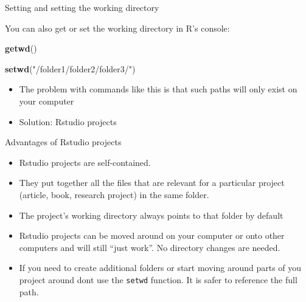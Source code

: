 \documentclass[ignorenonframetext,]{beamer}
\newenvironment{Shaded}{\begin{snugshade}}{\end{snugshade}}
\newcommand{\KeywordTok}[1]{\textcolor[rgb]{0.13,0.29,0.53}{\textbf{#1}}}
\newcommand{\NormalTok}[1]{#1}
\newcommand{\StringTok}[1]{\textcolor[rgb]{0.31,0.60,0.02}{#1}}
\providecommand{\tightlist}{%
  \setlength{\itemsep}{0pt}\setlength{\parskip}{0pt}}
\begin{document}
\begin{frame}[fragile]{Setting and setting the working directory}
\protect\hypertarget{setting-and-setting-the-working-directory}{}

You can also get or set the working directory in R's console:

\begin{Shaded}
\begin{Highlighting}[]
\KeywordTok{getwd}\NormalTok{()}
\end{Highlighting}
\end{Shaded}

\begin{Shaded}
\begin{Highlighting}[]
\KeywordTok{setwd}\NormalTok{(}\StringTok{"/folder1/folder2/folder3/"}\NormalTok{)}
\end{Highlighting}
\end{Shaded}

\begin{itemize}
\tightlist
\item
  The problem with commands like this is that such paths will only exist
  on your computer
\item
  Solution: Rstudio projects
\end{itemize}

\end{frame}

\begin{frame}[fragile]{Advantages of Rstudio projects}
\protect\hypertarget{advantages-of-rstudio-projects}{}

\begin{itemize}
\tightlist
\item
  Rstudio projects are self-contained.
\item
  They put together all the files that are relevant for a particular
  project (article, book, research project) in the same folder.
\item
  The project's working directory always points to that folder by
  default
\item
  Rstudio projects can be moved around on your computer or onto other
  computers and will still ``just work''. No directory changes are
  needed.
\item
  If you need to create additional folders or start moving around parts
  of you project around dont use the \texttt{setwd} function. It is
  safer to reference the full path.
\end{itemize}

\end{frame}
\end{document}
